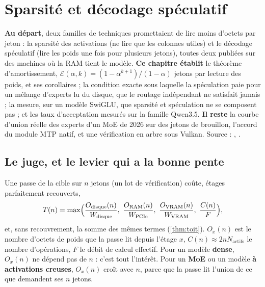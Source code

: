 \chapter{Sparsité et décodage spéculatif}\label{ch:sparsite}

\begin{origine}
\textbf{Au départ}, deux familles de techniques promettaient de lire moins d'octets par jeton : la sparsité des activations (ne lire que les colonnes utiles) et le décodage spéculatif (lire les poids une fois pour plusieurs jetons), toutes deux publiées sur des machines où la RAM tient le modèle.
\textbf{Ce chapitre établit} le théorème d'amortissement, $\mathcal E(\alpha,k) = (1-\alpha^{k+1})/(1-\alpha)$ jetons par lecture des poids, et ses corollaires ; la condition exacte sous laquelle la spéculation paie pour un mélange d'experts lu du disque, que le routage indépendant ne satisfait jamais ; la mesure, sur un modèle SwiGLU, que sparsité et spéculation ne se composent pas ; et les taux d'acceptation mesurés sur la famille Qwen3.5.
\textbf{Il reste} la courbe d'union réelle des experts d'un MoE de 2026 sur des jetons de brouillon, l'accord du module MTP natif, et une vérification en arbre sous Vulkan.
Source : , .
\end{origine}

\section{Le juge, et le levier qui a la bonne pente}\label{sec:spec-juge}

Une passe de la cible sur $n$ jetons (un lot de vérification) coûte, étages parfaitement recouverts,
\begin{equation}\label{eq:passe}
T(n) = \max\Bigl( \frac{O_{\mathrm{disque}}(n)}{W_{\mathrm{disque}}},\ \frac{O_{\mathrm{RAM}}(n)}{W_{\mathrm{PCIe}}},\ \frac{O_{\mathrm{VRAM}}(n)}{W_{\mathrm{VRAM}}},\ \frac{C(n)}{F} \Bigr),
\end{equation}
et, sans recouvrement, la somme des mêmes termes (\cref{thm:toit}). $O_x(n)$ est le nombre d'octets de poids que la passe lit depuis l'étage $x$, $C(n) \approx 2 n N_{\text{actifs}}$ le nombre d'opérations, $F$ le débit de calcul effectif. Pour un modèle \textbf{dense}, $O_x(n)$ ne dépend pas de $n$ : c'est tout l'intérêt. Pour un \textbf{MoE} ou un modèle \textbf{à activations creuses}, $O_x(n)$ croît avec $n$, parce que la passe lit l'union de ce que demandent ses $n$ jetons.

